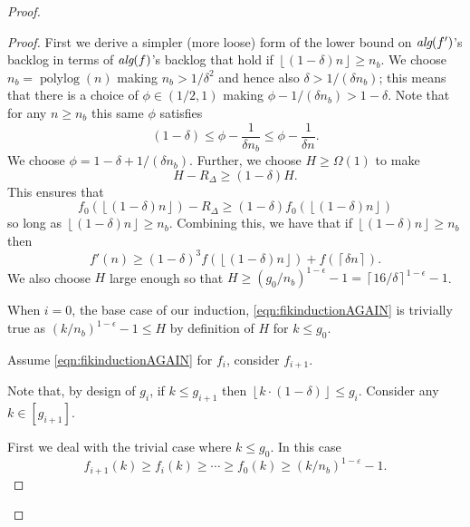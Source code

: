 \documentclass[twocolumn]{article}[10pt]
\DeclareMathOperator{\polylog}{\text{polylog}}
\newcommand{\alg}[1]{\textit{\text{alg}}({#1})}
\newcommand{\floor}[1]{\left\lfloor #1 \right\rfloor}
\newcommand{\ceil}[1]{\left\lceil #1 \right\rceil}
\begin{document}
\begin{proof}
\begin{proof}
  First we derive a simpler (more loose) form of the lower bound
  on $\alg{f'}$'s backlog in terms of $\alg{f}$'s backlog that
  hold if  $\floor{(1-\delta)n} \ge n_b$. We choose $n_b=
  \polylog(n)$ making $n_b > 1/\delta^2$ and hence also $\delta >
  1/(\delta n_b)$; this means that there is a choice of $\phi \in
  (1/2, 1)$ making $\phi - 1/(\delta n_b) > 1-\delta$. Note that
  for any $n\ge n_b$ this same $\phi$ satisfies $$(1-\delta) \le
  \phi - \frac{1}{\delta n_b} \le \phi - \frac{1}{ \delta n}.$$
  We choose $\phi = 1-\delta + 1/(\delta n_b)$. Further, we
  choose $H \ge \Omega(1)$ to make $$ H - R_\Delta \ge
  (1-\delta)H.$$ This ensures that $$f_0(\floor{(1-\delta) n}) -
  R_\Delta \ge (1-\delta)f_0(\floor{(1-\delta)n})$$ so long as
  $\floor{(1-\delta)n} \ge n_b$. Combining this, we have that if
  $\floor{(1-\delta)n}\ge n_b$ then 
  \begin{equation}
    \label{eq:simpleramplemmaobliviousforthmpf}
  f'(n) \ge (1-\delta)^3 f(\floor{(1-\delta)n}) + f(\ceil{\delta n}).
  \end{equation}
  We also choose $H$ large enough so that $H \ge
  (g_0/n_b)^{1-\epsilon}-1 = \ceil{16/\delta}^{1-\epsilon}-1$.

  When $i=0$, the base case of our induction,
  \eqref{eqn:fikinductionAGAIN} is trivially true as
  $(k/n_b)^{1-\epsilon} - 1 \le H$ by definition of $H$ for $k\le g_0$.

  Assume \eqref{eqn:fikinductionAGAIN} for $f_i$, consider $f_{i+1}$. 

  Note that, by design of $g_i$, if $k \le g_{i+1}$ then $\floor{k\cdot (1-\delta)} \le g_i$.
  Consider any $k\in [g_{i+1}]$. 

  First we deal with the trivial
  case where $k \le g_0$. In this case
  $$f_{i+1}(k) \ge f_i(k) \ge \cdots \ge f_0(k) \ge (k/n_b)^{1-\varepsilon} -1.$$


\end{proof}
\end{proof}
\end{document}
